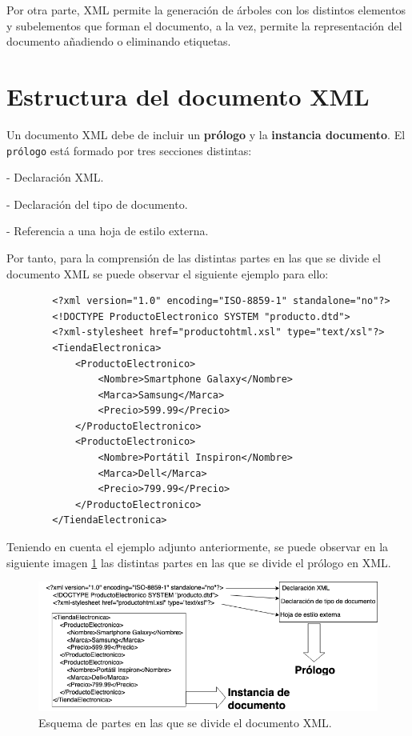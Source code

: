 \documentclass[11pt]{report}
\begin{document}
	Por otra parte, XML permite la generación de árboles con los distintos elementos y subelementos que forman el documento, a la vez, permite la representación del documento añadiendo o eliminando etiquetas.

	\section{Estructura del documento XML}

	Un documento XML debe de incluir un \textbf{prólogo} y la \textbf{instancia documento}. El \texttt{prólogo} está formado por tres secciones distintas: 

	- Declaración XML.
	
	- Declaración del tipo de documento.

	- Referencia a una hoja de estilo externa.

	Por tanto, para la comprensión de las distintas partes en las que se divide el documento XML se puede observar el siguiente ejemplo para ello:

	\begin{verbatim}
		<?xml version="1.0" encoding="ISO-8859-1" standalone="no"?>
		<!DOCTYPE ProductoElectronico SYSTEM "producto.dtd">
		<?xml-stylesheet href="productohtml.xsl" type="text/xsl"?>
		<TiendaElectronica>
			<ProductoElectronico>
				<Nombre>Smartphone Galaxy</Nombre>
				<Marca>Samsung</Marca>
				<Precio>599.99</Precio>
			</ProductoElectronico>
			<ProductoElectronico>
				<Nombre>Portátil Inspiron</Nombre>
				<Marca>Dell</Marca>
				<Precio>799.99</Precio>
			</ProductoElectronico>
		</TiendaElectronica>
	\end{verbatim}

Teniendo en cuenta el ejemplo adjunto anteriormente, se puede observar en la siguiente imagen \ref{fig:Example-XML} las distintas partes en las que se divide el prólogo en XML.

\begin{figure}[H]
	\centering
	\includegraphics[scale=0.7]{../img/XML-Example-1.png}
	\caption{Esquema de partes en las que se divide el documento XML.}
	\label{fig:Example-XML}
\end{figure}
\end{document}

